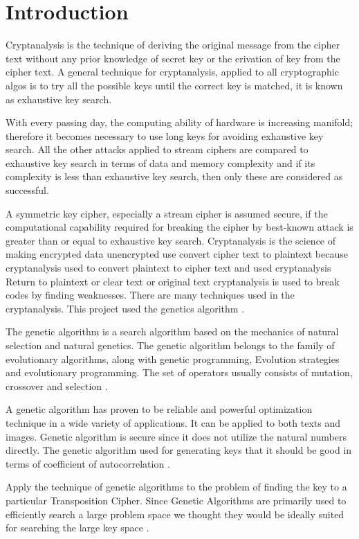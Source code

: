 \chapter{Introduction}

Cryptanalysis is the technique of deriving the original message from the cipher text without any prior knowledge of secret key or the erivation of key from the cipher text. A general technique for cryptanalysis, applied to all cryptographic algos is to try all the possible keys until the correct key is matched, it is known as exhaustive key search. 

With every passing day, the computing ability of hardware is increasing manifold; therefore it becomes necessary to use long keys for avoiding exhaustive key search. All the other attacks applied to stream ciphers are compared to exhaustive key search in terms of data and memory complexity and if its complexity is less than exhaustive key search, then only these are considered as successful. 

A symmetric key cipher, especially a stream cipher is assumed secure, if the computational capability required for breaking the cipher by
best-known attack is greater than or equal to exhaustive key search. 
Cryptanalysis is the science of making encrypted data unencrypted use convert cipher text to plaintext because cryptanalysis used to convert
plaintext to cipher text and used cryptanalysis Return to plaintext or clear text or original text cryptanalysis is used to break codes by finding
weaknesses. There are many techniques used in the cryptanalysis. This project used the genetics algorithm \cite{bokhari2012cryptanalysis}.

The genetic algorithm is a search algorithm based on the mechanics of natural selection and natural genetics. The genetic algorithm belongs to
 the family of evolutionary algorithms, along with genetic programming,
Evolution strategies and evolutionary programming. The set of operators
usually consists of mutation, crossover and selection \cite{mangano1995genetic}.

\newpage
A genetic
algorithm has proven to be reliable and powerful optimization technique in
a wide variety of applications. It can be applied to both texts and images.
Genetic algorithm is secure since it does not utilize the natural numbers
directly. The genetic algorithm used for generating keys that it should be
good in terms of coefficient of autocorrelation \cite{sindhuja2014symmetric}.

Apply the technique of
genetic algorithms to the problem of finding the key to a particular
Transposition Cipher. Since Genetic Algorithms are primarily used to
efficiently search a large problem space we thought they would be ideally
suited for searching the large key space \cite{brownbridge2007decrypting}.

